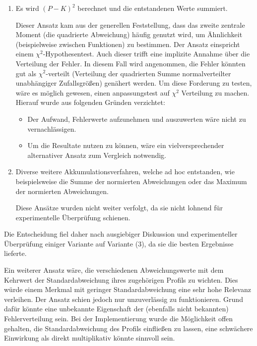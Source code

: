 \begin{enumerate}
\item Es wird $(P-K)^2$ berechnet und die entstandenen Werte summiert.
\par
Dieser Ansatz kam aus der generellen Feststellung, dass das zweite zentrale Moment (die quadrierte Abweichung) häufig genutzt wird, 
um Ähnlichkeit (beispielweise zwischen Funktionen) zu bestimmen.
Der Ansatz einspricht einem $\chi^2$-Hypothesentest. Auch dieser trifft eine implizite Annahme über die Verteilung der Fehler.
In diesem Fall wird angenommen, die Fehler könnten gut als $\chi^2$-verteilt (Verteilung der quadrierten Summe normalverteilter unabhängiger Zufallsgrößen) genähert werden.
Um diese Forderung zu testen, wäre es möglich gewesen, einen anpassungstest auf $\chi^2$ Verteilung zu machen.
Hierauf wurde aus folgenden Gründen verzichtet:
\begin{itemize}
\item
Der Aufwand, Fehlerwerte aufzunehmen und auszuwerten wäre nicht zu vernachlässigen.
\item Um die Resultate nutzen zu können, wäre ein vielversprechender alternativer Ansatz zum Vergleich notwendig.
\end{itemize}

\item Diverse weitere Akkumulationsverfahren, welche ad hoc entstanden, wie beispielsweise die Summe der normierten Abweichungen 
oder das Maximum der normierten Abweichungen.
\par
Diese Ansätze wurden nicht weiter verfolgt, da sie nicht lohnend für experimentelle Überprüfung schienen.
\end{enumerate}

Die Entscheidung fiel daher nach ausgiebiger Diskussion und experimenteller Überprüfung einiger Variante auf Variante (3), da sie die besten Ergebnisse lieferte.
\par

Ein weiterer Ansatz wäre, die verschiedenen Abweichungswerte mit dem Kehrwert der Standardabweichung ihres zugehörigen Profils zu wichten.
Dies würde einem Merkmal mit geringer Standardabweichung eine sehr hohe Relevanz verleihen.
Der Ansatz schien jedoch nur unzuverlässig zu funktionieren.
Grund dafür könnte eine unbekannte Eigenschaft der (ebenfalls nicht bekannten) Fehlerverteilung sein.
Bei der Implementierung wurde die Möglichkeit offen gehalten, die Standardabweichung des Profils einfließen zu lassen, 
eine schwächere Einwirkung als direkt multiplikativ könnte sinnvoll sein.

 


